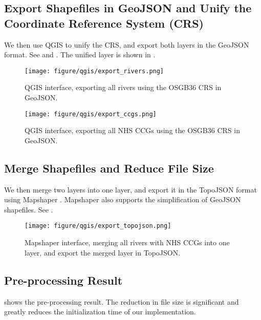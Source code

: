 \subsection{Export Shapefiles in GeoJSON and Unify the Coordinate Reference System (CRS)}

We then use QGIS to unify the CRS, and export both layers in the GeoJSON format. See  and . The unified layer is shown in .

{
\begin{figure}[h!]
    \centering
    \texttt{[image: figure/qgis/export\_rivers.png]}
    \caption{QGIS interface, exporting all rivers using the OSGB36 CRS in GeoJSON.}
    \label{fig:export_rivers}
\end{figure}

\begin{figure}[h!]
    \centering
    \texttt{[image: figure/qgis/export\_ccgs.png]}
    \caption{QGIS interface, exporting all NHS CCGs using the OSGB36 CRS in GeoJSON.}
    \label{fig:export_ccgs}
\end{figure}

}

\subsection{Merge Shapefiles and Reduce File Size}

We then merge two layers into one layer, and export it in the TopoJSON format using Mapshaper \cite{blochMapshaper}. Mapshaper also supports the simplification of GeoJSON shapefiles. See .

{
\begin{figure}[h!]
    \centering
    \texttt{[image: figure/qgis/export\_topojson.png]}
    \caption{Mapshaper interface, merging all rivers with NHS CCGs into one layer, and export the merged layer in TopoJSON.}
    \label{fig:export_topojson}
\end{figure}
}

\subsection{Pre-processing Result}

 shows the pre-processing result. The reduction in file size is significant and greatly reduces the initialization time of our implementation.

